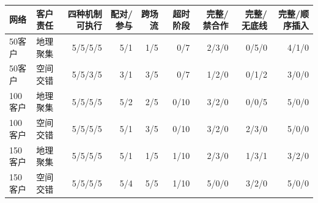 \begin{tabular*}{0.99\linewidth}{@{\extracolsep{\fill}}llrrrrrrr@{}}
\toprule
网络 & 客户责任 & 四种机制可执行 & 配对/参与 & 跨场流 & 超时阶段 & 完整/禁合作 & 完整/无底线 & 完整/顺序插入 \\
\midrule
50客户 & 地理聚集 & 5/5/5/5 & 5/1 & 1/5 & 0/7 & 2/3/0 & 0/5/0 & 4/1/0 \\
50客户 & 空间交错 & 5/5/3/5 & 3/1 & 3/5 & 0/7 & 1/2/0 & 0/1/2 & 3/0/0 \\
100客户 & 地理聚集 & 5/5/5/5 & 5/2 & 2/5 & 0/10 & 3/2/0 & 0/0/5 & 5/0/0 \\
100客户 & 空间交错 & 5/5/5/5 & 5/1 & 3/5 & 0/10 & 3/2/0 & 2/3/0 & 5/0/0 \\
150客户 & 地理聚集 & 5/5/5/5 & 5/1 & 1/5 & 1/10 & 2/3/0 & 1/3/1 & 3/2/0 \\
150客户 & 空间交错 & 5/5/5/5 & 5/4 & 5/5 & 1/10 & 5/0/0 & 3/2/0 & 5/0/0 \\
\bottomrule
\end{tabular*}
